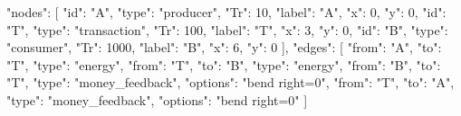 \documentclass{standalone}
\begin{document}
\begin{energeseData}
{
  "nodes": [
    {"id": "A", "type": "producer", "Tr": 10, "label": "A", "x": 0, "y": 0},
    {"id": "T", "type": "transaction", "Tr": 100, "label": "T", "x": 3, "y": 0},
    {"id": "B", "type": "consumer", "Tr": 1000, "label": "B", "x": 6, "y": 0}
  ],
  "edges": [
    {"from": "A", "to": "T", "type": "energy"},
    {"from": "T", "to": "B", "type": "energy"},
    {"from": "B", "to": "T", "type": "money_feedback", "options": "bend right=0"},
    {"from": "T", "to": "A", "type": "money_feedback", "options": "bend right=0"}
  ]
}
\end{energeseData}
\end{document}
